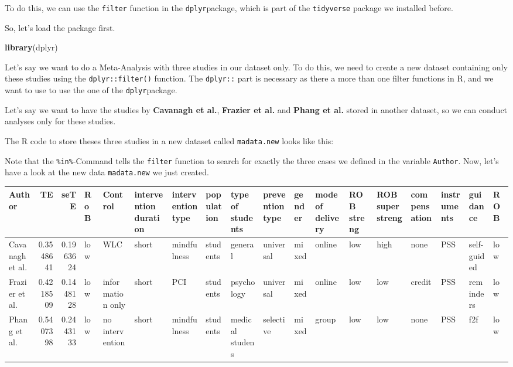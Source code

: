 \documentclass[]{book}
\newenvironment{Shaded}{\begin{snugshade}}{\end{snugshade}}
\newcommand{\KeywordTok}[1]{\textcolor[rgb]{0.13,0.29,0.53}{\textbf{#1}}}
\newcommand{\StringTok}[1]{\textcolor[rgb]{0.31,0.60,0.02}{#1}}
\newcommand{\OperatorTok}[1]{\textcolor[rgb]{0.81,0.36,0.00}{\textbf{#1}}}
\newcommand{\NormalTok}[1]{#1}
\theoremstyle{definition}
\theoremstyle{definition}
\theoremstyle{definition}
\theoremstyle{remark}
\begin{document}
To do this, we can use the \texttt{filter} function in the
\texttt{dplyr}package, which is part of the \texttt{tidyverse} package
we installed before.

So, let's load the package first.

\begin{Shaded}
\begin{Highlighting}[]
\KeywordTok{library}\NormalTok{(dplyr)}
\end{Highlighting}
\end{Shaded}

Let's say we want to do a Meta-Analysis with three studies in our
dataset only. To do this, we need to create a new dataset containing
only these studies using the \texttt{dplyr::filter()} function. The
\texttt{dplyr::} part is necessary as there a more than one filter
functions in R, and we want to use to use the one of the
\texttt{dplyr}package.

Let's say we want to have the studies by \textbf{Cavanagh et al.},
\textbf{Frazier et al.} and \textbf{Phang et al.} stored in another
dataset, so we can conduct analyses only for these studies.

The R code to store theses three studies in a new dataset called
\texttt{madata.new} looks like this:

\begin{Shaded}
\end{Shaded}

Note that the \texttt{\%in\%}-Command tells the \texttt{filter} function
to search for exactly the three cases we defined in the variable
\texttt{Author}. Now, let's have a look at the new data
\texttt{madata.new} we just created.

\begin{tabular}{l|r|r|l|l|l|l|l|l|l|l|l|l|l|l|l|l|l}
\hline
Author & TE & seTE & RoB & Control & intervention duration & intervention type & population & type of students & prevention type & gender & mode of delivery & ROB streng & ROB superstreng & compensation & instruments & guidance & ROB\\
\hline
Cavanagh et al. & 0.3548641 & 0.1963624 & low & WLC & short & mindfulness & students & general & universal & mixed & online & low & high & none & PSS & self-guided & low\\
\hline
Frazier et al. & 0.4218509 & 0.1448128 & low & information only & short & PCI & students & psychology & universal & mixed & online & low & low & credit & PSS & reminders & low\\
\hline
Phang et al. & 0.5407398 & 0.2443133 & low & no intervention & short & mindfulness & students & medical studens & selective & mixed & group & low & low & none & PSS & f2f & low\\
\hline
\end{tabular}
\end{document}
